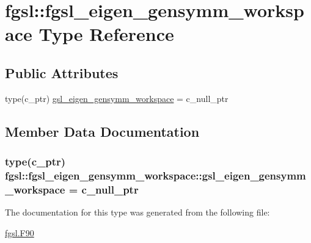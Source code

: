 \hypertarget{structfgsl_1_1fgsl__eigen__gensymm__workspace}{\section{fgsl\-:\-:fgsl\-\_\-eigen\-\_\-gensymm\-\_\-workspace Type Reference}
\label{structfgsl_1_1fgsl__eigen__gensymm__workspace}
}
\subsection*{Public Attributes}
\begin{DoxyCompactItemize}
\item 
type(c\-\_\-ptr) \hyperlink{structfgsl_1_1fgsl__eigen__gensymm__workspace_af54735f9be07ab0669882fef98e7a790}{gsl\-\_\-eigen\-\_\-gensymm\-\_\-workspace} = c\-\_\-null\-\_\-ptr
\end{DoxyCompactItemize}


\subsection{Member Data Documentation}
\hypertarget{structfgsl_1_1fgsl__eigen__gensymm__workspace_af54735f9be07ab0669882fef98e7a790}{
\subsubsection[{gsl\-\_\-eigen\-\_\-gensymm\-\_\-workspace}]{\setlength{\rightskip}{0pt plus 5cm}type(c\-\_\-ptr) fgsl\-::fgsl\-\_\-eigen\-\_\-gensymm\-\_\-workspace\-::gsl\-\_\-eigen\-\_\-gensymm\-\_\-workspace = c\-\_\-null\-\_\-ptr}}\label{structfgsl_1_1fgsl__eigen__gensymm__workspace_af54735f9be07ab0669882fef98e7a790}


The documentation for this type was generated from the following file\-:\begin{DoxyCompactItemize}
\item 
\hyperlink{fgsl_8F90}{fgsl.\-F90}\end{DoxyCompactItemize}
